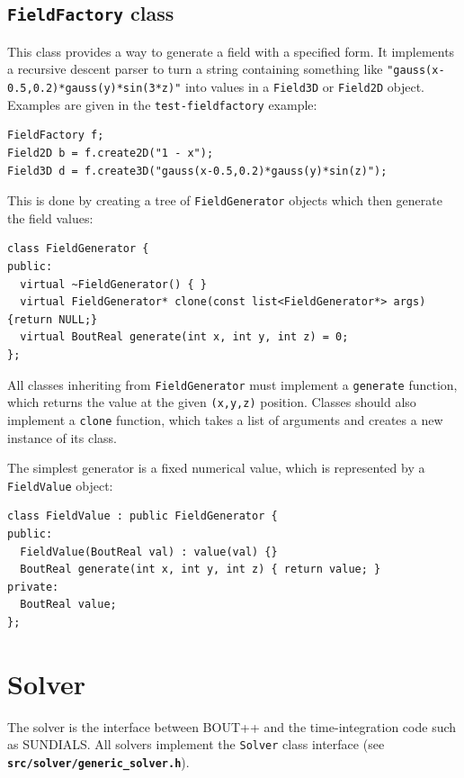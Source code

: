 \documentclass[12pt]{article}
\newcommand{\code}[1]{\texttt{#1}}
\newcommand{\file}[1]{\texttt{\bf #1}}
\begin{document}
\subsection{\lstinline!FieldFactory! class}

This class provides a way to generate a field with a specified form. It implements
a recursive descent parser to turn a string containing something like
\lstinline!"gauss(x-0.5,0.2)*gauss(y)*sin(3*z)"! into values in a \lstinline!Field3D!
or \lstinline!Field2D! object. Examples are given in the \texttt{test-fieldfactory} example:
\begin{lstlisting}
FieldFactory f;
Field2D b = f.create2D("1 - x");
Field3D d = f.create3D("gauss(x-0.5,0.2)*gauss(y)*sin(z)");
\end{lstlisting}

This is done by creating a tree of \lstinline!FieldGenerator! objects
which then generate the field values: 
\begin{lstlisting}[firstnumber=49]
class FieldGenerator {
public:
  virtual ~FieldGenerator() { }
  virtual FieldGenerator* clone(const list<FieldGenerator*> args) {return NULL;}
  virtual BoutReal generate(int x, int y, int z) = 0;
};
\end{lstlisting}
All classes inheriting from \lstinline!FieldGenerator! must implement a
\lstinline!generate! function, which returns the value
at the given \lstinline!(x,y,z)! position. Classes should also implement a
\lstinline!clone! function, which takes a list of arguments and creates a new
instance of its class.

The simplest generator is a fixed numerical value, which is represented
by a \lstinline!FieldValue! object: 
\begin{lstlisting}[firstnumber=59]
class FieldValue : public FieldGenerator {
public:
  FieldValue(BoutReal val) : value(val) {}
  BoutReal generate(int x, int y, int z) { return value; }
private:
  BoutReal value;
};
\end{lstlisting}

\section{Solver}
The solver is the interface between BOUT++ and the time-integration code
such as SUNDIALS. All solvers implement the \code{Solver} class
interface (see \file{src/solver/generic\_solver.h}).
\end{document}
